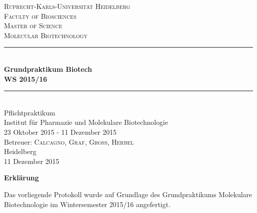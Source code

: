 \documentclass[
final,
twoside,
paper=a4, paper=portrait, pagesize=auto, 
fontsize=12pt,  
]{scrartcl}
\newcommand{\HRule}{\rule{\linewidth}{0.5mm}} %
\begin{document}
	\thispagestyle{empty}
	\begin{center}
		\textsc{\LARGE Ruprecht-Karls-Universität Heidelberg}\\
		\textsc{\large Faculty of Biosciences}\\[1cm]
		\textsc{\LARGE Master of Science\\[0.3cm]
			Molecular Biotechnology}\\[2.5cm]
		\HRule \\[0.4cm]
		\Huge
		\textbf{Grundpraktikum Biotech}\\ %
		\large
		\textbf{WS 2015/16} \\[0.4cm]
		\HRule
		\\[2cm]
		{\LARGE Pflichtpraktikum}\\
		\large
		Institut für Pharmazie und Molekulare Biotechnologie\\
		23 Oktober 2015 - 11 Dezember 2015\\[1,5cm]
		
		Betreuer: \textsc{Calcagno, Graf, Gross, Herbel}\\[2cm]
		
		Heidelberg\\
		11 Dezember 2015\\
	\end{center}
	\pagebreak
	
	\newpage
	\thispagestyle{empty}
	\quad
	\newpage
	\thispagestyle{empty}
	\begin{center}
		\huge\textbf{Erklärung}\\
	\end{center}
	\vspace{1cm}
	Das vorliegende Protokoll wurde auf Grundlage des Grundpraktikums Molekulare Biotechnologie im Wintersemester 2015/16 angefertigt.\\
\end{document}
